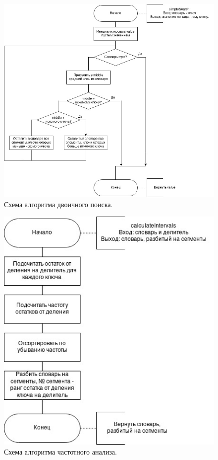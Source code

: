 \documentclass[12pt]{report}
\begin{document}
	\begin{figure}[H]
		\centering
		\includegraphics[scale=0.7]{binary_search.jpg}
		\caption{Схема алгоритма двоичного поиска.}
		\label{fig:mpr}
	\end{figure}
	
	\begin{figure}[H]
		\centering
		\includegraphics[scale=1]{calculate_intervals.jpg}
		\caption{Схема алгоритма частотного анализа.}
		\label{fig:mpr}
	\end{figure}
\end{document}
